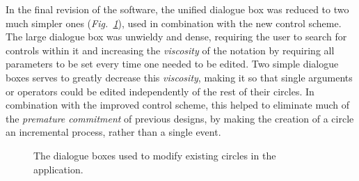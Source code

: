 \documentclass[12pt,twoside,notitlepage,xetex]{report}
\begin{document}
{In the final revision of the software, the unified dialogue box was reduced to two much simpler ones (\emph{Fig.~\ref{fig:Dialogues}}), used in combination with the new control scheme.  The large dialogue box was unwieldy and dense, requiring the user to search for controls within it and increasing the \emph{viscosity} of the notation by requiring all parameters to be set every time one needed to be edited.  Two simple dialogue boxes serves to greatly decrease this \emph{viscosity}, making it so that single arguments or operators could be edited independently of the rest of their circles.  In combination with the improved control scheme, this helped to eliminate much of the \emph{premature commitment} of previous designs, by making the creation of a circle an incremental process, rather than a single event.

\begin{center}
\begin{figure}[H]
\begin{center}
\end{center}
\caption{The dialogue boxes used to modify existing circles in the application.}
\label{fig:Dialogues}
\end{figure}
\end{center}

}
\end{document}
